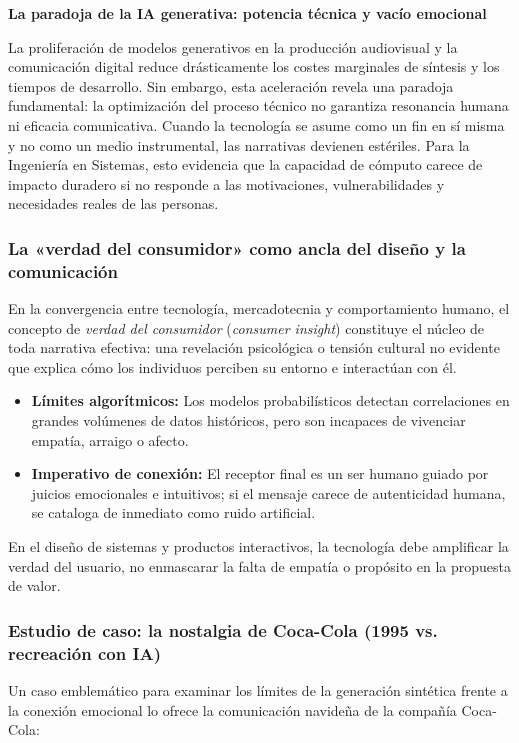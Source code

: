 \par\textbf{\textcolor{unabblue}{\faBrain}\quad La paradoja de la IA generativa: potencia técnica y vacío emocional}\par
La proliferación de modelos generativos en la producción audiovisual y la comunicación digital reduce drásticamente los costes marginales de síntesis y los tiempos de desarrollo. Sin embargo, esta aceleración revela una paradoja fundamental: la optimización del proceso técnico no garantiza resonancia humana ni eficacia comunicativa. Cuando la tecnología se asume como un fin en sí misma y no como un medio instrumental, las narrativas devienen estériles. Para la Ingeniería en Sistemas, esto evidencia que la capacidad de cómputo carece de impacto duradero si no responde a las motivaciones, vulnerabilidades y necesidades reales de las personas.

\subsubsection*{\textcolor{unabblue}{\faHeart}\quad La «verdad del consumidor» como ancla del diseño y la comunicación}
En la convergencia entre tecnología, mercadotecnia y comportamiento humano, el concepto de \textit{verdad del consumidor} (\textit{consumer insight}) constituye el núcleo de toda narrativa efectiva: una revelación psicológica o tensión cultural no evidente que explica cómo los individuos perciben su entorno e interactúan con él.

\begin{itemize}
  \item \textbf{Límites algorítmicos:} Los modelos probabilísticos detectan correlaciones en grandes volúmenes de datos históricos, pero son incapaces de vivenciar empatía, arraigo o afecto.
  \item \textbf{Imperativo de conexión:} El receptor final es un ser humano guiado por juicios emocionales e intuitivos; si el mensaje carece de autenticidad humana, se cataloga de inmediato como ruido artificial.
\end{itemize}

En el diseño de sistemas y productos interactivos, la tecnología debe amplificar la verdad del usuario, no enmascarar la falta de empatía o propósito en la propuesta de valor.

\clearpage
\subsubsection*{\textcolor{unabblue}{\faFilm}\quad Estudio de caso: la nostalgia de Coca-Cola (1995 vs. recreación con IA)}
Un caso emblemático para examinar los límites de la generación sintética frente a la conexión emocional lo ofrece la comunicación navideña de la compañía Coca-Cola:

